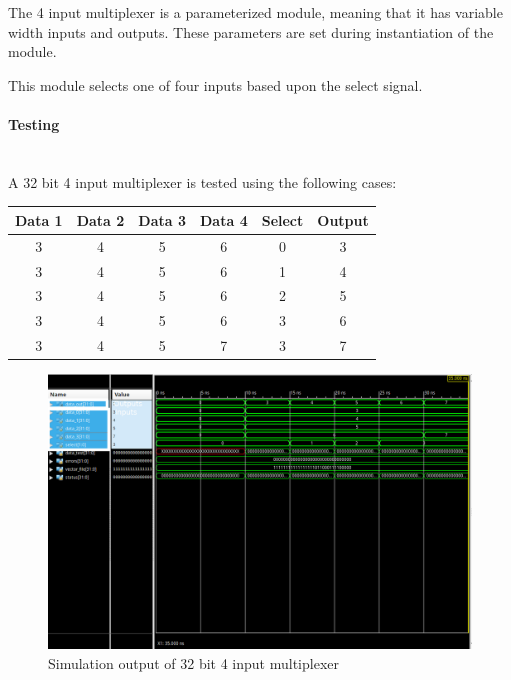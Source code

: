 \documentclass{article}
\begin{document}
    The 4 input multiplexer is a parameterized module, meaning that it has
    variable width inputs and outputs. These parameters are set during
    instantiation of the module.

    This module selects one of four inputs based upon the select signal.

    \paragraph{Testing}
    \hfill\\

    A 32 bit 4 input multiplexer is tested using the following cases:

    \begin{center}
        \begin{tabular}{|c|c|c|c|c||c|}
            \hline
            Data 1 & Data 2 & Data 3 & Data 4 & Select & Output
            \\\hline\hline
            3 & 4 & 5 & 6 & 0 & 3
            \\\hline
            3 & 4 & 5 & 6 & 1 & 4
            \\\hline
            3 & 4 & 5 & 6 & 2 & 5
            \\\hline
            3 & 4 & 5 & 6 & 3 & 6
            \\\hline
            3 & 4 & 5 & 7 & 3 & 7
            \\\hline
        \end{tabular}
    \end{center}


    \begin{figure}[H]
        \centering
        \includegraphics[width=0.9\paperwidth,center]{Screenshots/mux.png}
        \caption{Simulation output of 32 bit 4 input multiplexer}
    \end{figure}
\end{document}
